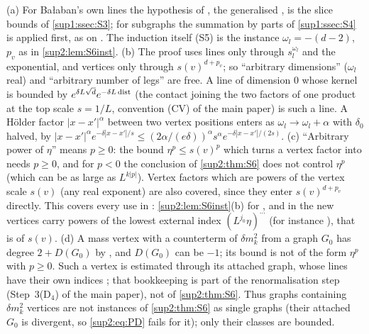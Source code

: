 \begin{remark}\label{sup2:rem:S6scope}
\textup{(a)} For Ba{\l}aban's own lines the hypothesis of \cite[Prop.~2.2]{Ba3}, the generalised \cite[(2.13)--(2.14)]{Ba3}, is the slice bounds of \cref{sup1:ssec:S3}; for subgraphs \cite[(2.4)]{Ba3} the summation by parts of \cref{sup1:ssec:S4} is applied first, as on \cite[p.~426]{Ba3}. The induction \cite[(2.16)]{Ba3} itself (S5) is the instance $\omega_l=-(d-2)$, $p_v$ as in \cref{sup2:lem:S6inst}.
\textup{(b)} The proof uses lines only through $s_l^{\omega_l}$ and the exponential, and vertices only through $s(v)^{d+p_v}$; so ``arbitrary dimensions'' ($\omega_l$ real) and ``arbitrary number of legs'' are free. A line of dimension $0$ whose kernel is bounded by $e^{\delta L\sqrt d}e^{-\delta L\operatorname{dist}}$ (the contact joining the two factors of one product \cite[(1.18)]{Ba3} at the top scale $s=1/L$, convention (CV) of the main paper) is such a line. A H\"older factor $|x-x'|^{\alpha}$ between two vertex positions enters as $\omega_l\to\omega_l+\alpha$ with $\delta_0$ halved, by $|x-x'|^{\alpha}e^{-\delta|x-x'|/s}\le(2\alpha/(e\delta))^{\alpha}s^{\alpha}e^{-\delta|x-x'|/(2s)}$.
\textup{(c)} ``Arbitrary power of $\eta$'' means $p\ge0$: the bound $\eta^{p}\le s(v)^{p}$ which turns a vertex factor into \cite[(2.14)]{Ba3} needs $p\ge0$, and for $p<0$ the conclusion of \cref{sup2:thm:S6} does not control $\eta^{p}$ (which can be as large as $L^{k|p|}$). Vertex factors which are powers of the vertex scale $s(v)$ (any real exponent) are also covered, since they enter $s(v)^{d+p_v}$ directly. This covers every use in \cite{Ba3}: \cref{sup2:lem:S6inst}(b) for \cite[(1.6)--(1.15)]{Ba3}, and in \cite[Sect.~3]{Ba3} the new vertices carry powers of the lowest external index $(L^{j_0}\eta)^{\cdots}$ (for instance \cite[(3.30), p.~442]{Ba3}), that is of $s(v)$.
\textup{(d)} A mass vertex \cite[(1.7)]{Ba3} with a counterterm of $\delta m^2_k$ from a graph $G_0$ has degree $2+D(G_0)$ by \cite[(2.3)]{Ba3}, and $D(G_0)$ can be $-1$; its bound is not of the form $\eta^{p}$ with $p\ge0$. Such a vertex is estimated through its attached graph, whose lines have their own indices \cite[(1.27)--(1.28)]{Ba3}; that bookkeeping is part of the renormalisation step (Step~3(D$_4$) of the main paper), not of \cref{sup2:thm:S6}. Thus graphs containing $\delta m^2_k$ vertices are not instances of \cref{sup2:thm:S6} as single graphs (their attached $G_0$ is divergent, so \eqref{sup2:eq:PD} fails for it); only their classes are bounded.
\end{remark}
